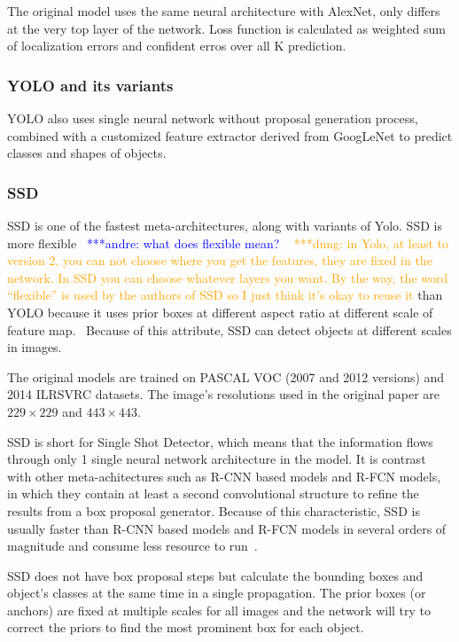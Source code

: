 \documentclass[conference]{IEEEtran}
\newcommand{\alnote}[1]{ {\textcolor{blue} { ***andre: #1 }}}
\newcommand{\dungnote}[1]{ {\textcolor{orange} { ***dung: #1 }}}
\newcommand{\alnote}[1]{}
\newcommand{\dungnote}[1]{}
\begin{document}
The original model uses the same neural architecture with AlexNet, only differs at the very top layer of the network. Loss function is calculated as weighted sum of localization errors and confident erros over all K prediction.


\subsubsection{YOLO and its variants}
YOLO also uses single neural network without proposal generation process, combined with a customized feature extractor derived from GoogLeNet to predict classes and shapes of objects.


\subsubsection{SSD}
SSD is one of the fastest meta-architectures, along with variants of Yolo. SSD is more flexible~\alnote{what does flexible mean?} ~\dungnote{in Yolo, at least to version 2, you can not choose where you get the features, they are fixed in the network. In SSD you can choose whatever layers you want. By the way, the word ``flexible'' is used by the authors of SSD so I just think it's okay to reuse it}than YOLO because it uses prior boxes at different aspect ratio at different scale of feature map.~\cite{liu2016ssd} Because of this attribute, SSD can detect objects at different scales in images.

The original models are trained on PASCAL VOC (2007 and 2012 versions) and 2014 ILRSVRC datasets. The image's resolutions used in the original paper are $229 \times 229$ and $443 \times 443$.

SSD is short for Single Shot Detector, which means that the information flows through only 1 single neural network architecture in the model. It is contrast with other meta-achitectures such as R-CNN based models and R-FCN models, in which they contain at least a second convolutional structure to refine the results from a box proposal generator. Because of this characteristic, SSD is usually faster than R-CNN based models and R-FCN models in several orders of magnitude and consume less resource to run~\cite{huang2017speed}.

SSD does not have box proposal steps but calculate the bounding boxes and object's classes at the same time in a single propagation. The prior boxes (or anchors) are fixed at multiple scales for all images and the network will try to correct the priors to find the most prominent box for each object.
\end{document}
